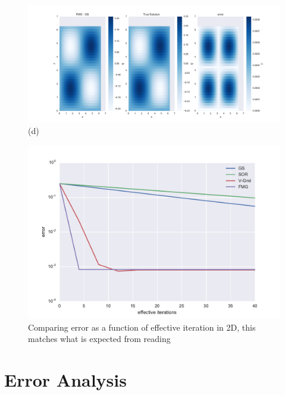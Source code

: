 \documentclass[pdftex,12pt,a4paper]{article}
\begin{document}
            \begin{figure}[!h]
                \centering
                \includegraphics[scale=.5]{../plots/fmg_sol_2d.pdf} 
                \caption{(d)}
            \end{figure}
            
            \begin{figure}[!h]
                \centering
                \includegraphics[scale=.75]{../plots/error_2d.pdf}
                \caption{Comparing error as a function of effective iteration in 2D, this matches what is expected from reading \cite{strang}}
            \end{figure}  

        \paragraph*{}

\newpage
\section{Error Analysis}
\end{document}
